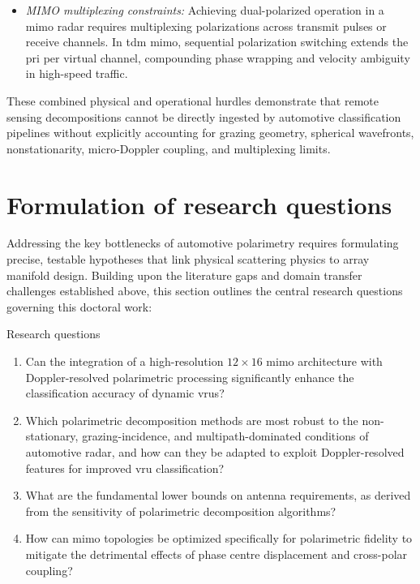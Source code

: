 \begin{itemize}
    For articulate \glspl{vru}, however, the polarimetric signature is inherently time-variant and coupled with the Doppler spectrum.
    For example, a pedestrian's torso exhibits a stable co-polarized single-bounce response, whereas swinging limbs generate transient cross-polarized depolarization at distinct Doppler offsets.
    \item \emph{MIMO multiplexing constraints:} Achieving dual-polarized operation in a \gls{mimo} radar requires multiplexing polarizations across transmit pulses or receive channels.
    In \gls{tdm} \gls{mimo}, sequential polarization switching extends the \gls{pri} per virtual channel, compounding phase wrapping and velocity ambiguity in high-speed traffic.
\end{itemize}

These combined physical and operational hurdles demonstrate that remote sensing decompositions cannot be directly ingested by automotive classification pipelines without explicitly accounting for grazing geometry, spherical wavefronts, nonstationarity, micro-Doppler coupling, and multiplexing limits.


\section{Formulation of research questions}
\label{sec:research-questions}

Addressing the key bottlenecks of automotive polarimetry requires formulating precise, testable hypotheses that link physical scattering physics to array manifold design.
Building upon the literature gaps and domain transfer challenges established above, this section outlines the central research questions governing this doctoral work:

\begin{custombox}{Research questions}
    \begin{enumerate}
        \item {Can the integration of a high-resolution $12 \times 16$ \gls{mimo} architecture with Doppler-resolved polarimetric processing significantly enhance the classification accuracy of dynamic \glspl{vru}?}
        \item {Which polarimetric decomposition methods are most robust to the non-stationary, grazing-incidence, and multipath-dominated conditions of automotive radar, and how can they be adapted to exploit Doppler-resolved features for improved \gls{vru} classification?}
        \item {What are the fundamental lower bounds on antenna requirements, as derived from the sensitivity of polarimetric decomposition algorithms?}
        \item {How can \gls{mimo} topologies be optimized specifically for polarimetric fidelity to mitigate the detrimental effects of phase centre displacement and cross-polar coupling?}
    \end{enumerate}
\end{custombox}

